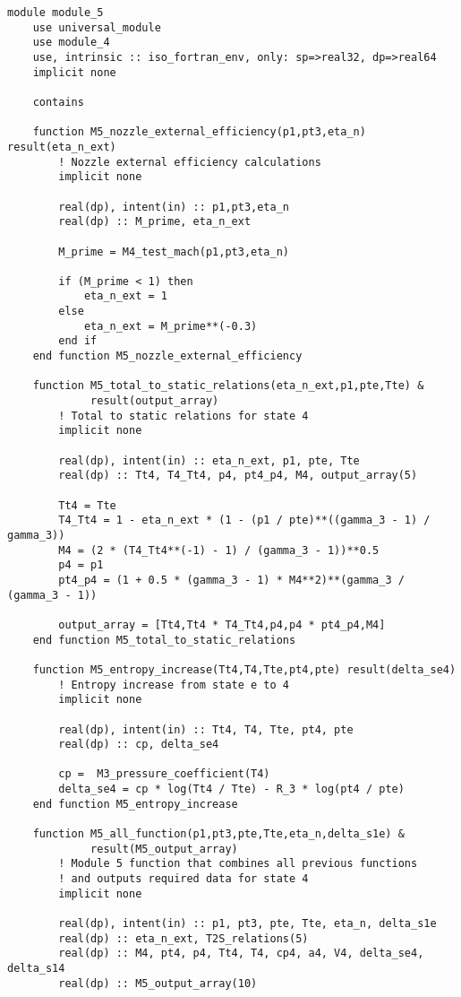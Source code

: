 \begin{verbatim}
module module_5
    use universal_module
    use module_4
    use, intrinsic :: iso_fortran_env, only: sp=>real32, dp=>real64
    implicit none

    contains

    function M5_nozzle_external_efficiency(p1,pt3,eta_n) result(eta_n_ext)
        ! Nozzle external efficiency calculations
        implicit none

        real(dp), intent(in) :: p1,pt3,eta_n
        real(dp) :: M_prime, eta_n_ext

        M_prime = M4_test_mach(p1,pt3,eta_n)

        if (M_prime < 1) then
            eta_n_ext = 1
        else
            eta_n_ext = M_prime**(-0.3)
        end if
    end function M5_nozzle_external_efficiency

    function M5_total_to_static_relations(eta_n_ext,p1,pte,Tte) &
             result(output_array)
        ! Total to static relations for state 4
        implicit none

        real(dp), intent(in) :: eta_n_ext, p1, pte, Tte
        real(dp) :: Tt4, T4_Tt4, p4, pt4_p4, M4, output_array(5)

        Tt4 = Tte
        T4_Tt4 = 1 - eta_n_ext * (1 - (p1 / pte)**((gamma_3 - 1) / gamma_3))
        M4 = (2 * (T4_Tt4**(-1) - 1) / (gamma_3 - 1))**0.5
        p4 = p1
        pt4_p4 = (1 + 0.5 * (gamma_3 - 1) * M4**2)**(gamma_3 / (gamma_3 - 1))

        output_array = [Tt4,Tt4 * T4_Tt4,p4,p4 * pt4_p4,M4]
    end function M5_total_to_static_relations

    function M5_entropy_increase(Tt4,T4,Tte,pt4,pte) result(delta_se4)
        ! Entropy increase from state e to 4
        implicit none

        real(dp), intent(in) :: Tt4, T4, Tte, pt4, pte
        real(dp) :: cp, delta_se4

        cp =  M3_pressure_coefficient(T4)
        delta_se4 = cp * log(Tt4 / Tte) - R_3 * log(pt4 / pte)
    end function M5_entropy_increase

    function M5_all_function(p1,pt3,pte,Tte,eta_n,delta_s1e) &
             result(M5_output_array)
        ! Module 5 function that combines all previous functions
        ! and outputs required data for state 4
        implicit none

        real(dp), intent(in) :: p1, pt3, pte, Tte, eta_n, delta_s1e
        real(dp) :: eta_n_ext, T2S_relations(5)
        real(dp) :: M4, pt4, p4, Tt4, T4, cp4, a4, V4, delta_se4, delta_s14
        real(dp) :: M5_output_array(10)


\end{verbatim}
